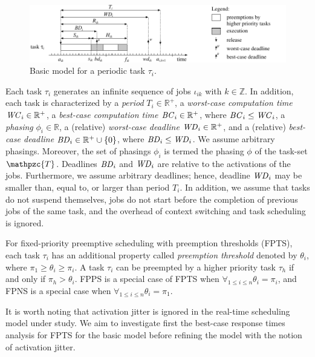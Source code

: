 \documentclass[conference,compsoc]{IEEEtran}
\newcommand{\bc}    {\mbox{\it BC}}
\newcommand{\bd}    {\mbox{\it BD}}
\newcommand{\wc}    {\mbox{\it WC}}
\newcommand{\wcd}   {\mbox{\it WD}}
\begin{document}
\begin{figure}
	\centering
	\includegraphics[width=1\linewidth]{fig/task_model}
	\caption{Basic model for a periodic task $\tau_i$.}
	\label{fig:taskmodel}
\end{figure}

Each task $\tau_i$ generates an infinite sequence of jobs $\iota_{ik}$ with $k\in \mathbb{Z}$. In addition, each task is characterized by a \textit{period} $T_i \in \mathbb{R^{+}}$, a \textit{worst-case computation time} $\wc_i \in \mathbb{R^{+}}$, a \textit{best-case computation time} $\bc_i \in \mathbb{R^{+}}$, where $\bc_i \leq \wc_i$, a \textit{phasing} $\phi_i \in \mathbb{R}$, a (relative) \textit{worst-case deadline} $\wcd_i \in \mathbb{R^{+}}$, and a (relative) \textit{best-case deadline} $\bd_i \in \mathbb{R^{+}}\cup \{0\}$, where $\bd_i \leq \wcd_i$. We assume arbitrary phasings. Moreover, the set of phasings $\phi_i$ is termed the phasing $\phi$ of the task-set $\mathpzc{T}$. Deadlines $\bd_i$ and $\wcd_i$ are relative to the activations of the jobs. Furthermore, we assume arbitrary deadlines; hence, deadline $\wcd_i$ may be smaller than, equal to, or larger than period $T_i$. In addition, we assume that tasks do not suspend themselves, jobs do not start before the completion of previous jobs of the same task, and the overhead of context switching and task scheduling is ignored.

For fixed-priority preemptive scheduling with preemption thresholds (FPTS), each task $\tau_i$ has an additional property called \textit{preemption threshold} denoted by $\theta_i$, where $\pi_1 \geq \theta_i \geq \pi_i$. A task $\tau_i$ can be preempted by a higher priority task $\tau_h$ if and only if $\pi_h > \theta_i$. FPPS is a special case of FPTS when $\forall_{1\leq i \leq n}\theta_i = \pi_i$, and FPNS is a special case when $\forall_{1\leq i \leq n}\theta_i = \pi_1$.

It is worth noting that activation jitter is ignored in the real-time scheduling model under study. We aim to investigate first the best-case response times analysis for FPTS for the basic model before refining the model with the notion of activation jitter.
\end{document}
